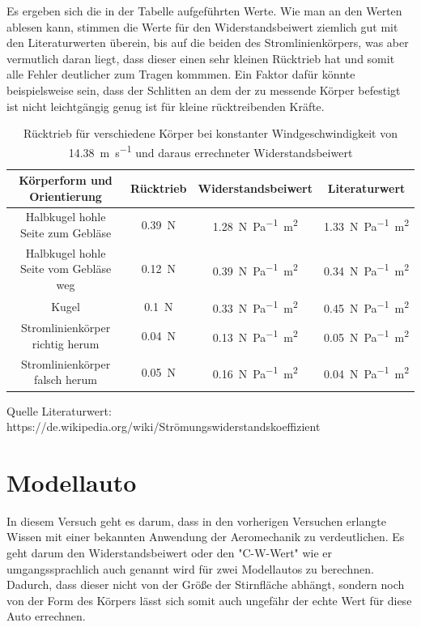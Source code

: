 Es ergeben sich die in der Tabelle aufgeführten Werte. Wie man an den Werten ablesen kann, stimmen die Werte für den Widerstandsbeiwert ziemlich gut mit den Literaturwerten überein, bis auf die beiden des Stromlinienkörpers, was aber vermutlich daran liegt, dass dieser einen sehr kleinen Rücktrieb hat und somit alle Fehler deutlicher zum Tragen kommmen. Ein Faktor dafür könnte beispielsweise sein, dass der Schlitten an dem der zu messende Körper befestigt ist nicht leichtgängig genug ist für kleine rücktreibenden Kräfte.

\begin{table}[h!]
    \caption{Rücktrieb für verschiedene Körper bei konstanter Windgeschwindigkeit von  \SI{14.38}{\metre\per\second} und daraus errechneter Widerstandsbeiwert}
    \centering
    \begin{tabular}{c c c c}
    \hline
    Körperform und Orientierung & Rücktrieb & Widerstandsbeiwert & Literaturwert\\
    \hline
    Halbkugel hohle Seite zum Gebläse   &   \SI{0.39}{\newton} & \SI{1.28}{\newton\per\pascal\square\metre} & \SI{1.33}{\newton\per\pascal\square\metre}  \\[5pt]
    Halbkugel hohle Seite vom Gebläse weg   &   \SI{0.12}{\newton} & \SI{0.39}{\newton\per\pascal\square\metre} &\SI{0.34}{\newton\per\pascal\square\metre}\\[5pt]
    Kugel & \SI{0.1}{\newton} & \SI{0.33}{\newton\per\pascal\square\metre} &\SI{0.45}{\newton\per\pascal\square\metre}\\[5pt]
    Stromlinienkörper richtig herum & \SI{0.04}{\newton} & \SI{0.13}{\newton\per\pascal\square\metre} & \SI{0.05}{\newton\per\pascal\square\metre}\\[5pt]
    Stromlinienkörper falsch herum & \SI{0.05}{\newton} & \SI{0.16}{\newton\per\pascal\square\metre} & \SI{0.04}{\newton\per\pascal\square\metre}\\[5pt]
    \hline
    \end{tabular}
    \label{tab:Versuch 2.3}
    Quelle Literaturwert: https://de.wikipedia.org/wiki/Strömungswiderstandskoeffizient
\end{table}

\section{Modellauto}

In diesem Versuch geht es darum, dass in den vorherigen Versuchen erlangte Wissen mit einer bekannten Anwendung der Aeromechanik zu verdeutlichen. Es geht darum den Widerstandsbeiwert oder den "C-W-Wert"  wie er umgangssprachlich auch genannt wird für zwei Modellautos zu berechnen. Dadurch, dass dieser nicht von der Größe der Stirnfläche abhängt, sondern noch von der Form des Körpers lässt sich somit auch ungefähr der echte Wert für diese Auto errechnen. 


